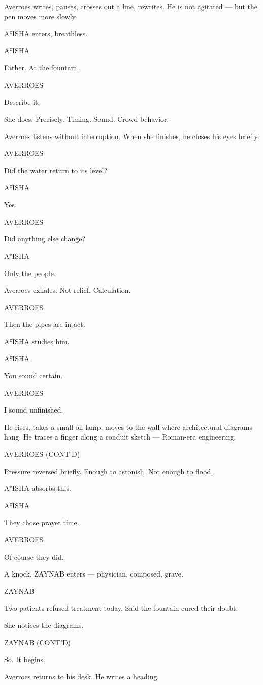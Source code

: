 \documentclass[12pt]{article}
\newlength{\charindent}
\newlength{\dialogueindent}
\newlength{\dialoguewidth}
\newcommand{\action}[1]{%
  \noindent#1\par\vspace{0.75em}%
}
\newcommand{\character}[1]{%
  \needspace{3\baselineskip}%
  \par\vspace{0.5em}%
  \noindent\hspace*{\charindent}\MakeUppercase{#1}\nopagebreak[4]%
}
\newcommand{\dialogue}[1]{%
  \par\nobreak\nopagebreak[4]%
  \noindent\hspace*{\dialogueindent}%
  \begin{minipage}[t]{\dialoguewidth}
  #1
  \end{minipage}%
  \par\vspace{0.5em}%
}
\newcommand{\contd}{\textsc{(cont'd)}}
\begin{document}
\action{Averroes writes, pauses, crosses out a line, rewrites. He is not agitated — but the pen moves more slowly.}

\action{AʿISHA enters, breathless.}

\character{AʿISHA}
\dialogue{Father. At the fountain.}

\character{AVERROES}
\dialogue{Describe it.}

\action{She does. Precisely. Timing. Sound. Crowd behavior.}

\action{Averroes listens without interruption. When she finishes, he closes his eyes briefly.}

\character{AVERROES}
\dialogue{Did the water return to its level?}

\character{AʿISHA}
\dialogue{Yes.}

\character{AVERROES}
\dialogue{Did anything else change?}

\character{AʿISHA}
\dialogue{Only the people.}

\action{Averroes exhales. Not relief. Calculation.}

\character{AVERROES}
\dialogue{Then the pipes are intact.}

\action{AʿISHA studies him.}

\character{AʿISHA}
\dialogue{You sound certain.}

\character{AVERROES}
\dialogue{I sound unfinished.}

\action{He rises, takes a small oil lamp, moves to the wall where architectural diagrams hang. He traces a finger along a conduit sketch — Roman-era engineering.}

\character{AVERROES \contd}
\dialogue{Pressure reversed briefly. Enough to astonish. Not enough to flood.}

\action{AʿISHA absorbs this.}

\character{AʿISHA}
\dialogue{They chose prayer time.}

\character{AVERROES}
\dialogue{Of course they did.}

\action{A knock. ZAYNAB enters — physician, composed, grave.}

\character{ZAYNAB}
\dialogue{Two patients refused treatment today. Said the fountain cured their doubt.}

\action{She notices the diagrams.}

\character{ZAYNAB \contd}
\dialogue{So. It begins.}

\action{Averroes returns to his desk. He writes a heading.}
\end{document}
